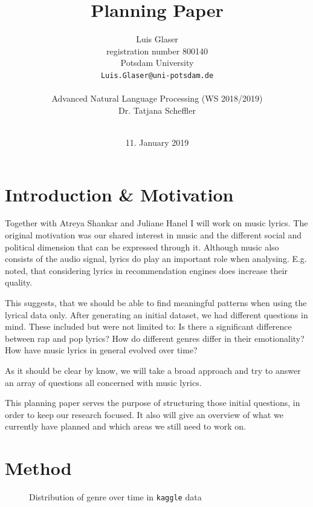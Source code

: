 \documentclass[11pt,a4paper]{article}
\title{Planning Paper}
\author{Luis Glaser\\
  registration number 800140 \\
  Potsdam University \\
  {\tt Luis.Glaser@uni-potsdam.de} \\
  \\
  Advanced Natural Language Processing (WS 2018/2019) \\
  Dr. Tatjana Scheffler \\
  \\}
\date{11. January 2019}
\begin{document}
\maketitle

\thispagestyle{plain}

\section*{Introduction \& Motivation}

Together with Atreya Shankar and Juliane Hanel I will work on music lyrics. The original motivation was our shared interest in music and the different social and political dimension that can be expressed through it. Although music also consists of the audio signal, lyrics do play an important role when analysing. E.g. \citet{DBLP:conf/coling/FellS14} noted, that considering lyrics in recommendation engines does increase their quality.

This suggests, that we should be able to find meaningful patterns when using the lyrical data only. After generating an initial dataset, we had different questions in mind. These included but were not limited to: Is there a significant difference between rap and pop lyrics? How do different genres differ in their emotionality? How have music lyrics in general evolved over time? 

As it should be clear by know, we will take a broad approach and try to answer an array of questions all concerned with music lyrics.

This planning paper serves the purpose of structuring those initial questions, in order to keep our research focused. It also will give an overview of what we currently have planned and which areas we still need to work on. 

\section*{Method}\label{sec:method}
\begin{figure}[h]
	\centering
	\caption{Distribution of genre over time in \texttt{kaggle} data}
       \label{fig:kaggle}
\end{figure}
\end{document}

